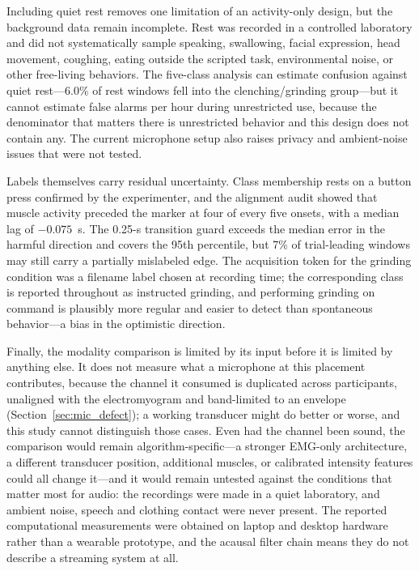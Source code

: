 \documentclass[pdflatex,sn-nature,iicol]{sn-jnl}
\begin{document}
Including quiet rest removes one limitation of an activity-only design, but the background data remain incomplete. Rest was recorded in a controlled laboratory and did not systematically sample speaking, swallowing, facial expression, head movement, coughing, eating outside the scripted task, environmental noise, or other free-living behaviors. The five-class analysis can estimate confusion against quiet rest---6.0\% of rest windows fell into the clenching/grinding group---but it cannot estimate false alarms per hour during unrestricted use, because the denominator that matters there is unrestricted behavior and this design does not contain any. The current microphone setup also raises privacy and ambient-noise issues that were not tested.

Labels themselves carry residual uncertainty. Class membership rests on a button press confirmed by the experimenter, and the alignment audit showed that muscle activity preceded the marker at four of every five onsets, with a median lag of $-0.075$~s. The 0.25-s transition guard exceeds the median error in the harmful direction and covers the 95th percentile, but 7\% of trial-leading windows may still carry a partially mislabeled edge. The acquisition token for the grinding condition was a filename label chosen at recording time; the corresponding class is reported throughout as instructed grinding, and performing grinding on command is plausibly more regular and easier to detect than spontaneous behavior---a bias in the optimistic direction.

Finally, the modality comparison is limited by its input before it is limited by anything else. It does not measure what a microphone at this placement contributes, because the channel it consumed is duplicated across participants, unaligned with the electromyogram and band-limited to an envelope (Section~\ref{sec:mic_defect}); a working transducer might do better or worse, and this study cannot distinguish those cases. Even had the channel been sound, the comparison would remain algorithm-specific---a stronger EMG-only architecture, a different transducer position, additional muscles, or calibrated intensity features could all change it---and it would remain untested against the conditions that matter most for audio: the recordings were made in a quiet laboratory, and ambient noise, speech and clothing contact were never present. The reported computational measurements were obtained on laptop and desktop hardware rather than a wearable prototype, and the acausal filter chain means they do not describe a streaming system at all.
\end{document}

